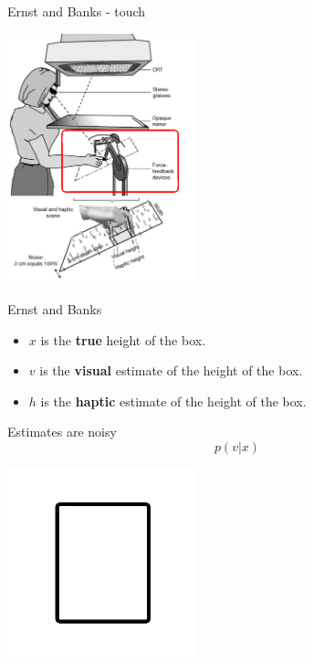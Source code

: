\documentclass{beamer}
\newcommand{\crish}{\color{reddish}}
\newcommand{\cbla}{\color{black}}
\newcommand{\cred}{\color{red}}
\newcommand{\cblu}{\color{blue}}
\begin{document}
\begin{frame}{Ernst and Banks - touch}
\begin{center}
\includegraphics[width=5.5cm]{fig_ernstbanks_haptic.png}
\end{center}
\vfill
\end{frame}

\begin{frame}{Ernst and Banks}
  \begin{itemize}
  \item \crish$x$\cbla{} is the \textbf{true} height of the box.
  \item \cblu$v$\cbla{} is the \cblu\textbf{visual}\cbla{} estimate of the height of the box.
  \item \cred$h$\cbla{} is the \cred\textbf{haptic}\cbla{} estimate of the height of the box.
  \end{itemize}
\vfill
{}
\end{frame}

\begin{frame}{Estimates are noisy}
\crish$$p(v|x)$$\cbla{} 
  \begin{center}
\includegraphics[width=5.5cm]{box.png}
\end{center}
\end{frame}
\end{document}
